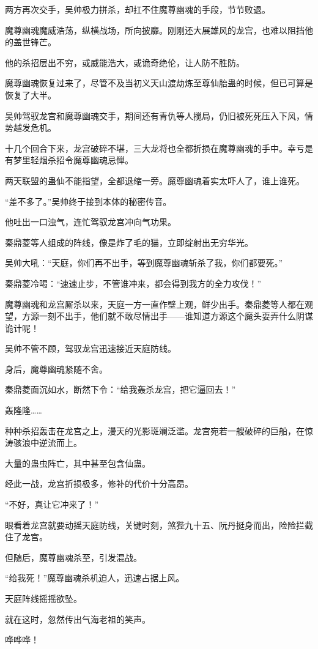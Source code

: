 \begin{this_body}
两方再次交手，吴帅极力拼杀，却扛不住魔尊幽魂的手段，节节败退。

魔尊幽魂魔威浩荡，纵横战场，所向披靡。刚刚还大展雄风的龙宫，也难以阻挡他的盖世锋芒。

他的杀招层出不穷，或威能浩大，或诡奇绝伦，让人防不胜防。

魔尊幽魂恢复过来了，尽管不及当初义天山渡劫炼至尊仙胎蛊的时候，但已可算是恢复了大半。

吴帅驾驭龙宫和魔尊幽魂交手，期间还有青仇等人搅局，仍旧被死死压入下风，情势越发危机。

十几个回合下来，龙宫破碎不堪，三大龙将也全都折损在魔尊幽魂的手中。幸亏是有梦里轻烟杀招令魔尊幽魂忌惮。

两天联盟的蛊仙不能指望，全都退缩一旁。魔尊幽魂着实太吓人了，谁上谁死。

“差不多了。”吴帅终于接到本体的秘密传音。

他吐出一口浊气，连忙驾驭龙宫冲向气功果。

秦鼎菱等人组成的阵线，像是炸了毛的猫，立即绽射出无穷华光。

吴帅大吼：“天庭，你们再不出手，等到魔尊幽魂斩杀了我，你们都要死。”

秦鼎菱冷喝：“速速止步，不管谁冲来，都会得到我方的全力攻伐！”

魔尊幽魂和龙宫厮杀以来，天庭一方一直作壁上观，鲜少出手。秦鼎菱等人都在观望，方源一刻不出手，他们就不敢尽情出手——谁知道方源这个魔头耍弄什么阴谋诡计呢！

吴帅不管不顾，驾驭龙宫迅速接近天庭防线。

身后，魔尊幽魂紧随不舍。

秦鼎菱面沉如水，断然下令：“给我轰杀龙宫，把它逼回去！”

轰隆隆……

种种杀招轰击在龙宫之上，漫天的光影斑斓泛滥。龙宫宛若一艘破碎的巨船，在惊涛骇浪中逆流而上。

大量的蛊虫阵亡，其中甚至包含仙蛊。

经此一战，龙宫折损极多，修补的代价十分高昂。

“不好，真让它冲来了！”

眼看着龙宫就要动摇天庭防线，关键时刻，煞狴九十五、阮丹挺身而出，险险拦截住了龙宫。

但随后，魔尊幽魂杀至，引发混战。

“给我死！”魔尊幽魂杀机迫人，迅速占据上风。

天庭阵线摇摇欲坠。

就在这时，忽然传出气海老祖的笑声。

哗哗哗！


\end{this_body}
